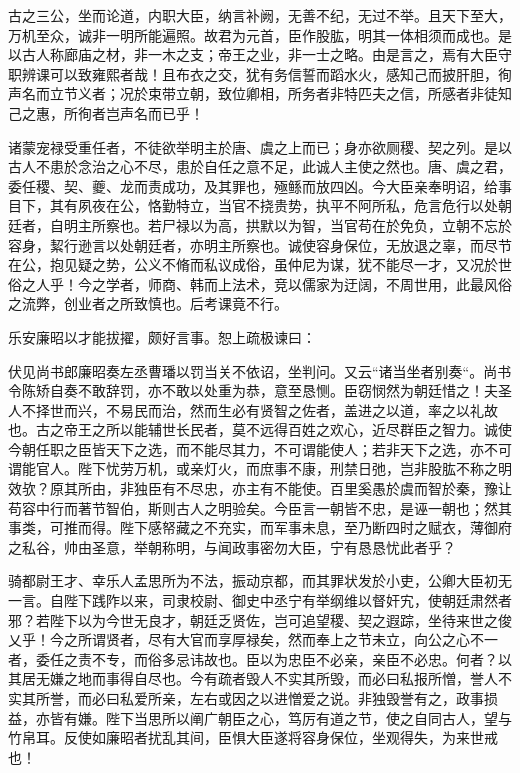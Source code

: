 \documentclass[12pt,UTF8]{ctexbook}
\begin{document}
古之三公，坐而论道，内职大臣，纳言补阙，无善不纪，无过不举。且天下至大，万机至众，诚非一明所能遍照。故君为元首，臣作股肱，明其一体相须而成也。是以古人称廊庙之材，非一木之支；帝王之业，非一士之略。由是言之，焉有大臣守职辨课可以致雍熙者哉！且布衣之交，犹有务信誓而蹈水火，感知己而披肝胆，徇声名而立节义者；况於束带立朝，致位卿相，所务者非特匹夫之信，所感者非徒知己之惠，所徇者岂声名而已乎！

诸蒙宠禄受重任者，不徒欲举明主於唐、虞之上而已；身亦欲厕稷、契之列。是以古人不患於念治之心不尽，患於自任之意不足，此诚人主使之然也。唐、虞之君，委任稷、契、夔、龙而责成功，及其罪也，殛鲧而放四凶。今大臣亲奉明诏，给事目下，其有夙夜在公，恪勤特立，当官不挠贵势，执平不阿所私，危言危行以处朝廷者，自明主所察也。若尸禄以为高，拱默以为智，当官苟在於免负，立朝不忘於容身，絜行逊言以处朝廷者，亦明主所察也。诚使容身保位，无放退之辜，而尽节在公，抱见疑之势，公义不脩而私议成俗，虽仲尼为谋，犹不能尽一才，又况於世俗之人乎！今之学者，师商、韩而上法术，竞以儒家为迂阔，不周世用，此最风俗之流弊，创业者之所致慎也。后考课竟不行。

乐安廉昭以才能拔擢，颇好言事。恕上疏极谏曰：

伏见尚书郎廉昭奏左丞曹璠以罚当关不依诏，坐判问。又云“诸当坐者别奏“。尚书令陈矫自奏不敢辞罚，亦不敢以处重为恭，意至恳恻。臣窃悯然为朝廷惜之！夫圣人不择世而兴，不易民而治，然而生必有贤智之佐者，盖进之以道，率之以礼故也。古之帝王之所以能辅世长民者，莫不远得百姓之欢心，近尽群臣之智力。诚使今朝任职之臣皆天下之选，而不能尽其力，不可谓能使人；若非天下之选，亦不可谓能官人。陛下忧劳万机，或亲灯火，而庶事不康，刑禁日弛，岂非股肱不称之明效欤？原其所由，非独臣有不尽忠，亦主有不能使。百里奚愚於虞而智於秦，豫让苟容中行而著节智伯，斯则古人之明验矣。今臣言一朝皆不忠，是诬一朝也；然其事类，可推而得。陛下感帑藏之不充实，而军事未息，至乃断四时之赋衣，薄御府之私谷，帅由圣意，举朝称明，与闻政事密勿大臣，宁有恳恳忧此者乎？

骑都尉王才、幸乐人孟思所为不法，振动京都，而其罪状发於小吏，公卿大臣初无一言。自陛下践阼以来，司隶校尉、御史中丞宁有举纲维以督奸宄，使朝廷肃然者邪？若陛下以为今世无良才，朝廷乏贤佐，岂可追望稷、契之遐踪，坐待来世之俊乂乎！今之所谓贤者，尽有大官而享厚禄矣，然而奉上之节未立，向公之心不一者，委任之责不专，而俗多忌讳故也。臣以为忠臣不必亲，亲臣不必忠。何者？以其居无嫌之地而事得自尽也。今有疏者毁人不实其所毁，而必曰私报所憎，誉人不实其所誉，而必曰私爱所亲，左右或因之以进憎爱之说。非独毁誉有之，政事损益，亦皆有嫌。陛下当思所以阐广朝臣之心，笃厉有道之节，使之自同古人，望与竹帛耳。反使如廉昭者扰乱其间，臣惧大臣遂将容身保位，坐观得失，为来世戒也！
\end{document}
